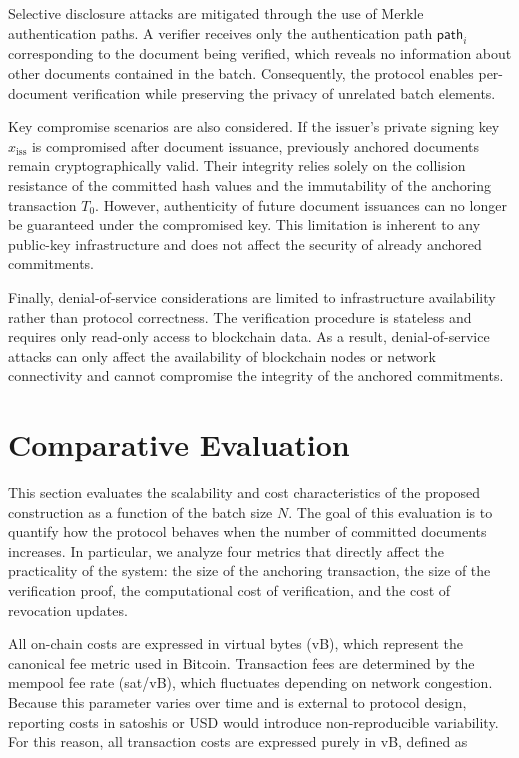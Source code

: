 \documentclass[preprint,12pt]{elsarticle}
\begin{document}
Selective disclosure attacks are mitigated through the use of Merkle authentication paths. A verifier receives only the authentication path $\mathsf{path}_i$ corresponding to the document being verified, which reveals no information about other documents contained in the batch. Consequently, the protocol enables per-document verification while preserving the privacy of unrelated batch elements.

Key compromise scenarios are also considered. If the issuer's private signing key $x_{\mathrm{iss}}$ is compromised after document issuance, previously anchored documents remain cryptographically valid. Their integrity relies solely on the collision resistance of the committed hash values and the immutability of the anchoring transaction $T_0$. However, authenticity of future document issuances can no longer be guaranteed under the compromised key. This limitation is inherent to any public-key infrastructure and does not affect the security of already anchored commitments.

Finally, denial-of-service considerations are limited to infrastructure availability rather than protocol correctness. The verification procedure is stateless and requires only read-only access to blockchain data. As a result, denial-of-service attacks can only affect the availability of blockchain nodes or network connectivity and cannot compromise the integrity of the anchored commitments.



\section{Comparative Evaluation}
\label{sec:evaluation}

This section evaluates the scalability and cost characteristics of the proposed construction as a function of the batch size $N$. 
The goal of this evaluation is to quantify how the protocol behaves when the number of committed documents increases. 
In particular, we analyze four metrics that directly affect the practicality of the system: the size of the anchoring transaction, the size of the verification proof, the computational cost of verification, and the cost of revocation updates.

All on-chain costs are expressed in virtual bytes (vB), which represent the canonical fee metric used in Bitcoin. 
Transaction fees are determined by the mempool fee rate (sat/vB), which fluctuates depending on network congestion. Because this parameter varies over time and is external to protocol design, reporting costs in satoshis or USD would introduce non-reproducible variability. 
For this reason, all transaction costs are expressed purely in vB, defined as
\end{document}
